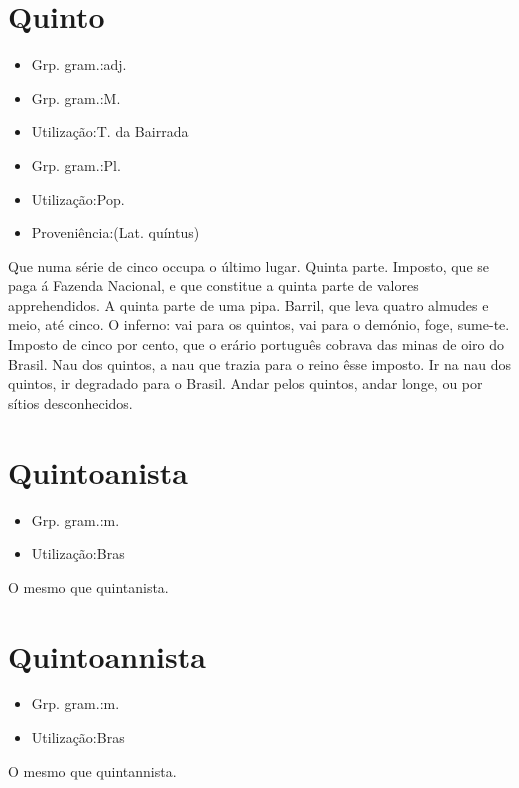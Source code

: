 \section{Quinto}
\begin{itemize}
\item {Grp. gram.:adj.}
\end{itemize}
\begin{itemize}
\item {Grp. gram.:M.}
\end{itemize}
\begin{itemize}
\item {Utilização:T. da Bairrada}
\end{itemize}
\begin{itemize}
\item {Grp. gram.:Pl.}
\end{itemize}
\begin{itemize}
\item {Utilização:Pop.}
\end{itemize}
\begin{itemize}
\item {Proveniência:(Lat. \textunderscore quíntus\textunderscore )}
\end{itemize}
Que numa série de cinco occupa o último lugar.
Quinta parte.
Imposto, que se paga á Fazenda Nacional, e que constitue a quinta parte de valores apprehendidos.
A quinta parte de uma pipa.
Barril, que leva quatro almudes e meio, até cinco.
O inferno: \textunderscore vai para os quintos\textunderscore , vai para o demónio, foge, sume-te.
Imposto de cinco por cento, que o erário português cobrava das minas de oiro do Brasil.
\textunderscore Nau dos quintos\textunderscore , a nau que trazia para o reino êsse imposto.
\textunderscore Ir na nau dos quintos\textunderscore , ir degradado para o Brasil.
\textunderscore Andar pelos quintos\textunderscore , andar longe, ou por sítios desconhecidos.
\section{Quintoanista}
\begin{itemize}
\item {Grp. gram.:m.}
\end{itemize}
\begin{itemize}
\item {Utilização:Bras}
\end{itemize}
O mesmo que \textunderscore quintanista\textunderscore .
\section{Quintoannista}
\begin{itemize}
\item {Grp. gram.:m.}
\end{itemize}
\begin{itemize}
\item {Utilização:Bras}
\end{itemize}
O mesmo que \textunderscore quintannista\textunderscore .
